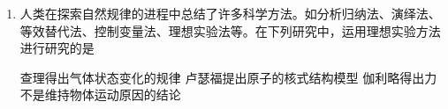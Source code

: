\documentclass[\gkver]{gaokaozhenti}
\begin{document}
\begin{enumerate}
上述进口电池的电动势是 $\UV$。上述国产电池最多可放出 $\UmAh$ 的电量；若该电池平均工作电流为 $0.03\UA$，则最多可使用  小时。


\item
人类在探索自然规律的进程中总结了许多科学方法。如分析归纳法、演绎法、等效替代法、控制变量法、理想实验法等。在下列研究中，运用理想实验方法进行研究的是

{查理得出气体状态变化的规律}
{卢瑟福提出原子的核式结构模型}
{伽利略得出力不是维持物体运动原因的结论}


\end{enumerate}
\end{document}
